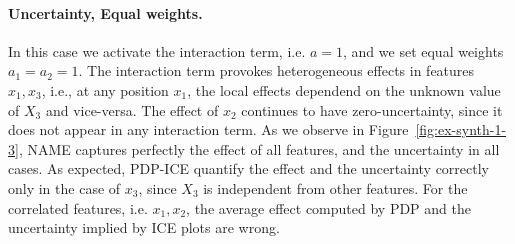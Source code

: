 \documentclass[twoside]{article}
\begin{document}
\paragraph{Uncertainty, Equal weights.}

In this case we activate the interaction term, i.e. \(a=1\), and we
set equal weights \(a_1=a_2=1\). The interaction term provokes
heterogeneous effects in features \(x_1, x_3\), i.e., at any position
\(x_1\), the local effects dependend on the unknown value of \(X_3\)
and vice-versa. The effect of \(x_2\) continues to have
zero-uncertainty, since it does not appear in any interaction term. As
we observe in Figure~\ref{fig:ex-synth-1-3}, NAME captures perfectly
the effect of all features, and the uncertainty in all cases. As
expected, PDP-ICE quantify the effect and the uncertainty correctly
only in the case of \(x_3\), since \(X_3\) is independent from other
features. For the correlated features, i.e. \(x_1, x_2\), the average
effect computed by PDP and the uncertainty implied by ICE plots are
wrong.
\end{document}
